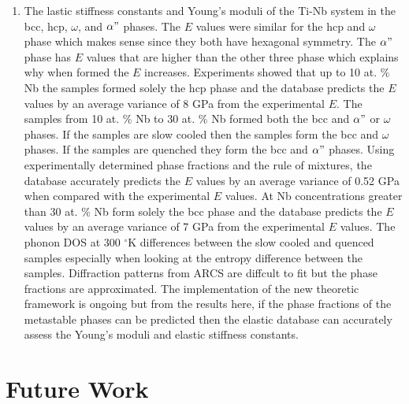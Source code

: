\begin{enumerate}
	\item The lastic stiffness constants and Young's moduli of the Ti-Nb system in the bcc, hcp, $\omega$, and $\alpha"$ phases. The $E$ values were similar for the hcp and $\omega$ phase which makes sense since they both have hexagonal symmetry. The $\alpha"$ phase has $E$ values that are higher than the other three phase which explains why when formed the $E$ increases. Experiments showed that up to 10 at. \% Nb the samples formed solely the hcp phase and the database predicts the $E$ values by an average variance of 8 GPa from the experimental $E$. The samples from 10 at. \% Nb to 30 at. \% Nb formed both the bcc and $\alpha"$ or $\omega$ phases. If the samples are slow cooled then the samples form the bcc and $\omega$ phases. If the samples are quenched they form the bcc and $\alpha"$ phases. Using experimentally determined phase fractions and the rule of mixtures, the database accurately predicts the $E$ values by an average variance of 0.52 GPa when compared with the experimental $E$ values. At Nb concentrations greater than 30 at. \% Nb form solely the bcc phase and the database predicts the $E$ values by an average variance of 7 GPa from the experimental $E$ values. The phonon DOS at 300 $^\circ$K differences between the slow cooled and quenced samples especially when looking at the entropy difference between the samples. Diffraction patterns from ARCS are diffcult to fit but the phase fractions are approximated. The implementation of the new theoretic framework is ongoing but from the results here, if the phase fractions of the metastable phases can be predicted then the elastic database can accurately assess the Young's moduli and elastic stiffness constants. 
\end{enumerate}

\section{Future Work}

